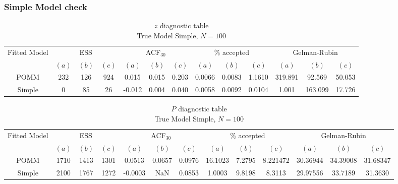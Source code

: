 \documentclass[11pt]{amsart}
\begin{document}
\clearpage




\subsubsection{Simple Model check}




\begin{table}[h]
\centering
\caption*{
{\large $z$ diagnostic table} \\ 
{\small True Model Simple, $N=100$}
} 
\begin{tabular}{ccccccccccccc}
\toprule
\multirow{2}{*}{Fitted Model} & \multicolumn{3}{c}{ESS} & \multicolumn{3}{c}{
ACF$_{30}$} & \multicolumn{3}{c}{$\%$ accepted} & \multicolumn{3}{c}{Gelman-Rubin}\\
\cmidrule(lr){2-4} \cmidrule(lr){5-7} \cmidrule(lr){8-10} \cmidrule(lr){11-13} 
& $(a)$ & $(b)$ & $(c)$ & $(a)$ & $(b)$ & $(c)$ & $(a)$ & $(b)$ & $(c)$ & $(a)$ & $(b)$ & $(c)$ \\
\midrule
POMM &232 & 126 & 924 & 0.015 & 0.015 & 0.203 & 0.0066 & 0.0083 & 1.1610 & 319.891 & 92.569 & 50.053 \\
Simple &0 & 85 & 26 & -0.012 & 0.004 & 0.040 & 0.0058 & 0.0092 & 0.0104 & 1.001 & 163.099 & 17.726 \\
\bottomrule
\end{tabular}
\label{table:simulations_from_simple}
\end{table}

\begin{table}[h]
\centering
\caption*{
{\large $P$ diagnostic table} \\ 
{\small True Model Simple, $N=100$}
} 
\begin{tabular}{ccccccccccccc}
\toprule
\multirow{2}{*}{Fitted Model} & \multicolumn{3}{c}{ESS} & \multicolumn{3}{c}{
ACF$_{30}$} & \multicolumn{3}{c}{$\%$ accepted} & \multicolumn{3}{c}{Gelman-Rubin}\\
\cmidrule(lr){2-4} \cmidrule(lr){5-7} \cmidrule(lr){8-10} \cmidrule(lr){11-13} 
& $(a)$ & $(b)$ & $(c)$ & $(a)$ & $(b)$ & $(c)$ & $(a)$ & $(b)$ & $(c)$ & $(a)$ & $(b)$ & $(c)$ \\
\midrule
POMM &1710 & 1413 & 1301 & 0.0513 & 0.0657 & 0.0976 & 16.1023 & 7.2795 & 8.221472 & 30.36944 & 34.39008 & 31.68347 \\
Simple &2100 & 1767 & 1272 & -0.0003& NaN & 0.0853 & 1.0003 & 9.8198 & 8.3113 & 29.97556 & 33.7189 & 31.3630\\
\bottomrule
\end{tabular}
\label{table:simulations_from_simple}
\end{table}
\end{document}
